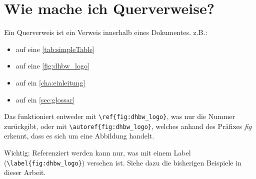 \section{Wie mache ich Querverweise?}
\label{sec:querverweise}

Ein Querverweis ist ein Verweis innerhalb eines Dokumentes. z.B.:

\begin{itemize}
    \item auf eine \autoref{tab:simpleTable}
    \item auf eine \autoref{fig:dhbw_logo}
    \item auf ein \autoref{cha:einleitung}
    \item auf ein \autoref{sec:glossar}
\end{itemize}

Das funktioniert entweder mit \lstinline|\ref{fig:dhbw_logo}|, was nur die Nummer zurückgibt, oder mit \lstinline|\autoref{fig:dhbw_logo}|, welches anhand des Präfixes \textit{fig} erkennt, dass es sich um eine Abbildung handelt.

Wichtig: Referenziert werden kann nur, was mit einem Label (\lstinline|\label{fig:dhbw_logo}|) versehen ist. Siehe dazu die bisherigen Beispiele in dieser Arbeit.